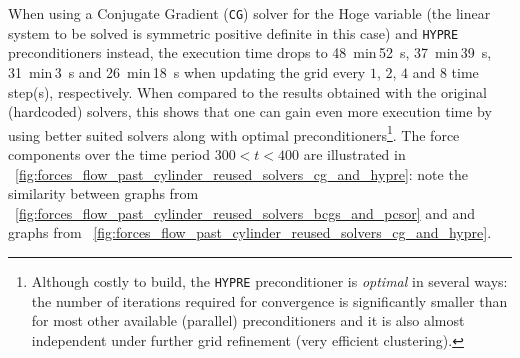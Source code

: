 \documentclass[11pt, a4paper]{article}
\newcommand{\fig}{\figurename \ }
\theoremstyle{remark}
\begin{document}
When using a Conjugate Gradient (\verb|CG|) solver for the Hoge variable (the linear system to be solved is symmetric positive definite in this case) and \verb|HYPRE| preconditioners instead, the execution time drops to \SI{48}{\minute}\,\SI{52}{\second}, \SI{37}{\minute}\,\SI{39}{\second}, \SI{31}{\minute}\,\SI{3}{\second} and \SI{26}{\minute}\,\SI{18}{\second} when updating the grid every $1$, $2$, $4$ and $8$ time step(s), respectively. When compared to the results obtained with the original (hardcoded) solvers, this shows that one can gain even more execution time by using better suited solvers along with optimal preconditioners\footnote{Although costly to build, the \texttt{HYPRE} preconditioner is \emph{optimal} in several ways: the number of iterations required for convergence is significantly smaller than for most other available (parallel) preconditioners and it is also almost independent under further grid refinement (very efficient clustering).}. The force components over the time period $300 < t < 400$ are illustrated in \fig \ref{fig:forces_flow_past_cylinder_reused_solvers_cg_and_hypre}: note the similarity between graphs from \fig \ref{fig:forces_flow_past_cylinder_reused_solvers_bcgs_and_pcsor} and and graphs from \fig \ref{fig:forces_flow_past_cylinder_reused_solvers_cg_and_hypre}. 
\end{document}
